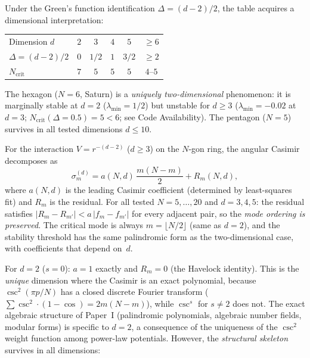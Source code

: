 Under the Green's function identification $\Delta = (d{-}2)/2$,
the table acquires a dimensional interpretation:
\begin{center}
\begin{tabular}{lccccc}
\toprule
Dimension $d$ & $2$ & $3$ & $4$ & $5$ & $\ge 6$ \\
$\Delta = (d{-}2)/2$ & $0$ & $1/2$ & $1$ & $3/2$ & $\ge 2$ \\
\midrule
$N_{\mathrm{crit}}$ & $7$ & $5$ & $5$ & $5$ & $4$--$5$ \\
\bottomrule
\end{tabular}
\end{center}
\noindent
The hexagon ($N = 6$, Saturn) is a \emph{uniquely two-dimensional}
phenomenon: it is marginally stable at $d = 2$ ($\lambda_{\min} = 1/2$)
but unstable for $d \ge 3$ ($\lambda_{\min} = -0.02$ at $d = 3$;
$N_{\mathrm{crit}}(\Delta{=}0.5) = 5 < 6$; see Code Availability).
The pentagon ($N = 5$) survives in all tested dimensions $d \le 10$.

\begin{proposition}
\label{prop:soft-havelock}
For the interaction $V = r^{-(d-2)}$ ($d \ge 3$) on the $N$-gon ring,
the angular Casimir decomposes as
\begin{equation}\label{eq:soft-havelock}
  \sigma_m^{(d)} = a(N,d)\,\frac{m(N{-}m)}{2} + R_m(N,d),
\end{equation}
where $a(N,d)$ is the leading Casimir coefficient (determined by
least-squares fit) and $R_m$ is the residual.
For all tested $N = 5,\ldots,20$ and $d = 3,4,5$: the
residual satisfies $|R_m - R_{m'}| < a\,|f_m - f_{m'}|$ for every
adjacent pair, so the \emph{mode ordering is preserved}.
The critical mode is always $m = \lfloor N/2 \rfloor$ (same as $d=2$),
and the stability threshold has the same palindromic form as the
two-dimensional case, with coefficients that depend on~$d$.
\end{proposition}

\noindent
For $d = 2$ ($s = 0$): $a = 1$ exactly and $R_m = 0$ (the Havelock
identity). This is the \emph{unique} dimension where the Casimir is
an exact polynomial, because $\csc^2(\pi p/N)$ has a closed discrete
Fourier transform ($\sum\csc^2\cdot(1{-}\cos) = 2m(N{-}m)$), while
$\csc^s$ for $s \ne 2$ does not.
The exact algebraic structure of Paper~I (palindromic polynomials,
algebraic number fields, modular forms) is specific to $d = 2$,
a consequence of the uniqueness of the $\csc^2$ weight function
among power-law potentials.
However, the \emph{structural skeleton} survives in all dimensions:

